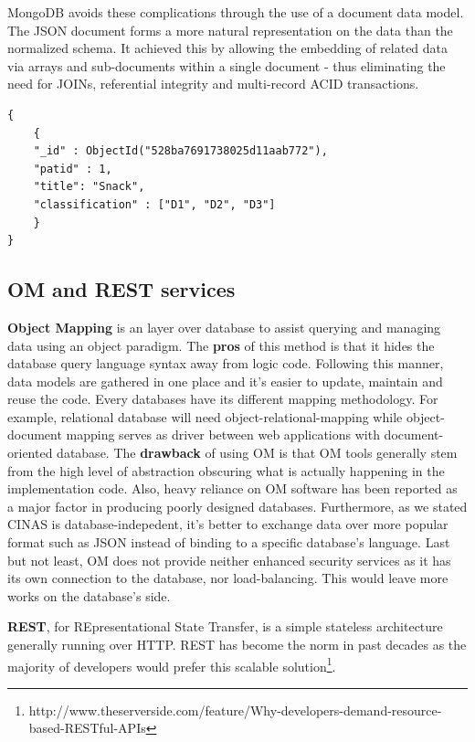 \documentclass{article}
\begin{document}
MongoDB avoids these complications through the use of a document data model. The JSON document forms a more natural representation on the data than the normalized schema. It achieved this by allowing the embedding of related data via arrays and sub-documents within a single document - thus eliminating the need for JOINs, referential integrity and multi-record ACID transactions.

\begin{lstlisting}[caption=Json Example]
{
	{
	"_id" : ObjectId("528ba7691738025d11aab772"),
	"patid" : 1,
	"title": "Snack",
	"classification" : ["D1", "D2", "D3"]
	}
}
\end{lstlisting}

\subsection{OM and REST services}

\textbf{Object Mapping} is an layer over database to assist querying and managing data using an object paradigm. The \textbf{pros} of this method is that it hides the database query language syntax away from logic code. Following this manner, data models are gathered in one place and it's easier to update, maintain and reuse the code. Every databases have its different mapping methodology. For example, relational database will need object-relational-mapping while object-document mapping serves as driver between web applications with document-oriented database. The \textbf{drawback} of using OM is that OM tools generally stem from the high level of abstraction obscuring what is actually happening in the implementation code. Also, heavy reliance on OM software has been reported as a major factor in producing poorly designed databases. Furthermore, as we stated CINAS is database-indepedent, it's better to exchange data over more popular format such as JSON instead of binding to a specific database's language. Last but not least, OM does not provide neither enhanced security services as it has its own connection to the database, nor load-balancing. This would leave more works on the database's side.

\textbf{REST}, for REpresentational State Transfer, is a simple stateless architecture generally running over HTTP. REST has become the norm in past decades as the majority of developers would prefer this scalable solution\footnote{http://www.theserverside.com/feature/Why-developers-demand-resource-based-RESTful-APIs}.
\end{document}
